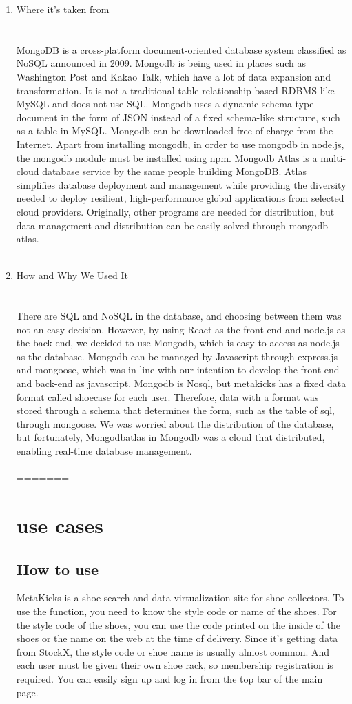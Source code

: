 \documentclass[conference]{IEEEtran}
\begin{document}
\begin{enumerate}
\item Where it's taken from\\
\\\\MongoDB is a cross-platform document-oriented database system classified as NoSQL announced in 2009. Mongodb is being used in places such as Washington Post and Kakao Talk, which have a lot of data expansion and transformation. It is not a traditional table-relationship-based RDBMS like MySQL and does not use SQL. Mongodb uses a dynamic schema-type document in the form of JSON instead of a fixed schema-like structure, such as a table in MySQL. Mongodb can be downloaded free of charge from the Internet. Apart from installing mongodb, in order to use mongodb in node.js, the mongodb module must be installed using npm. Mongodb Atlas is a multi-cloud database service by the same people building MongoDB. Atlas simplifies database deployment and management while providing the diversity needed to deploy resilient, high-performance global applications from selected cloud providers. Originally, other programs are needed for distribution, but data management and distribution can be easily solved through mongodb atlas.\\\\
\item How and Why We Used It\\
\\\\There are SQL and NoSQL in the database, and choosing between them was not an easy decision. However, by using React as the front-end and node.js as the back-end, we decided to use Mongodb, which is easy to access as node.js as the database. Mongodb can be managed by Javascript through express.js and mongoose, which was in line with our intention to develop the front-end and back-end as javascript. Mongodb is Nosql, but metakicks has a fixed data format called shoecase for each user. Therefore, data with a format was stored through a schema that determines the form, such as the table of sql, through mongoose. We was worried about the distribution of the database, but fortunately, Mongodbatlas in Mongodb was a cloud that distributed, enabling real-time database management.\\\\
=======
\section{use cases}
\subsection{How to use}
MetaKicks is a shoe search and data virtualization site for shoe collectors. To use the function, you need to know the style code or name of the shoes. For the style code of the shoes, you can use the code printed on the inside of the shoes or the name on the web at the time of delivery. Since it's getting data from StockX, the style code or shoe name is usually almost common. And each user must be given their own shoe rack, so membership registration is required. You can easily sign up and log in from the top bar of the main page.\\

\end{enumerate}
\end{document}
